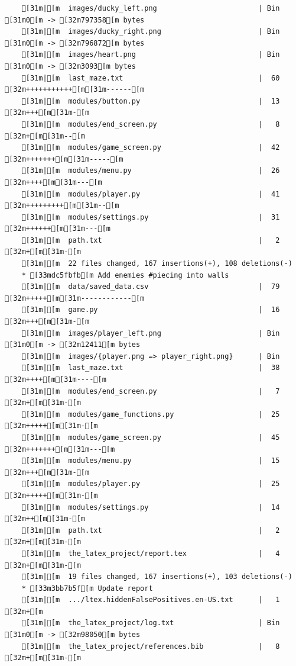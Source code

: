 \documentclass{article}
\begin{document}
{\begin{verbatim}
    [31m|[m  images/ducky_left.png                        | Bin [31m0[m -> [32m797358[m bytes
    [31m|[m  images/ducky_right.png                       | Bin [31m0[m -> [32m796872[m bytes
    [31m|[m  images/heart.png                             | Bin [31m0[m -> [32m3093[m bytes
    [31m|[m  last_maze.txt                                |  60 [32m+++++++++++[m[31m------[m
    [31m|[m  modules/button.py                            |  13 [32m+++[m[31m-[m
    [31m|[m  modules/end_screen.py                        |   8 [32m+[m[31m--[m
    [31m|[m  modules/game_screen.py                       |  42 [32m+++++++[m[31m-----[m
    [31m|[m  modules/menu.py                              |  26 [32m++++[m[31m---[m
    [31m|[m  modules/player.py                            |  41 [32m+++++++++[m[31m--[m
    [31m|[m  modules/settings.py                          |  31 [32m++++++[m[31m---[m
    [31m|[m  path.txt                                     |   2 [32m+[m[31m-[m
    [31m|[m  22 files changed, 167 insertions(+), 108 deletions(-)
    * [33mdc5fbfb[m Add enemies #piecing into walls
    [31m|[m  data/saved_data.csv                          |  79 [32m+++++[m[31m------------[m
    [31m|[m  game.py                                      |  16 [32m+++[m[31m-[m
    [31m|[m  images/player_left.png                       | Bin [31m0[m -> [32m12411[m bytes
    [31m|[m  images/{player.png => player_right.png}      | Bin
    [31m|[m  last_maze.txt                                |  38 [32m++++[m[31m----[m
    [31m|[m  modules/end_screen.py                        |   7 [32m+[m[31m-[m
    [31m|[m  modules/game_functions.py                    |  25 [32m+++++[m[31m-[m
    [31m|[m  modules/game_screen.py                       |  45 [32m+++++++[m[31m---[m
    [31m|[m  modules/menu.py                              |  15 [32m+++[m[31m-[m
    [31m|[m  modules/player.py                            |  25 [32m+++++[m[31m-[m
    [31m|[m  modules/settings.py                          |  14 [32m++[m[31m-[m
    [31m|[m  path.txt                                     |   2 [32m+[m[31m-[m
    [31m|[m  the_latex_project/report.tex                 |   4 [32m+[m[31m-[m
    [31m|[m  19 files changed, 167 insertions(+), 103 deletions(-)
    * [33m3bb7b5f[m Update report
    [31m|[m  .../ltex.hiddenFalsePositives.en-US.txt      |   1 [32m+[m
    [31m|[m  the_latex_project/log.txt                    | Bin [31m0[m -> [32m98050[m bytes
    [31m|[m  the_latex_project/references.bib             |   8 [32m+[m[31m-[m

\end{verbatim}}
\end{document}
